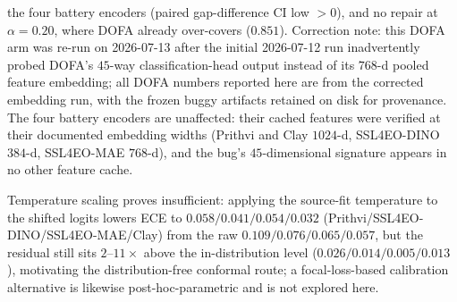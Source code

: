 \documentclass[journal]{IEEEtran}
\renewcommand{\_}{\textunderscore\allowbreak}
\begin{document}
the four battery encoders (paired gap-difference CI low $>0$), and no repair at $\alpha=0.20$, where DOFA already
over-covers ($0.851$). Correction note: this DOFA arm was re-run on 2026-07-13 after the initial
2026-07-12 run inadvertently probed DOFA's $45$-way classification-head output instead of
its $768$-d pooled feature embedding; all DOFA numbers reported here are from the corrected
embedding run, with the frozen buggy artifacts retained on disk for provenance. The four battery encoders are
unaffected: their cached features were verified at their documented embedding widths (Prithvi and Clay
$1024$-d, SSL4EO-DINO $384$-d, SSL4EO-MAE $768$-d), and the bug's $45$-dimensional signature appears in no
other feature cache.

Temperature scaling \citep{guo2017calibration} proves insufficient: applying the source-fit temperature to the shifted logits
lowers ECE to $0.058/0.041/0.054/0.032$ (Prithvi/SSL4EO-DINO/SSL4EO-MAE/Clay) from the raw
$0.109/0.076/0.065/0.057$, but the residual still sits $2$--$11\times$ above the in-distribution level
($0.026/0.014/0.005/0.013$), motivating the distribution-free conformal route; a focal-loss-based
calibration alternative \citep{mukhoti2020calibrating} is likewise post-hoc-parametric and is not explored here.
\end{document}
